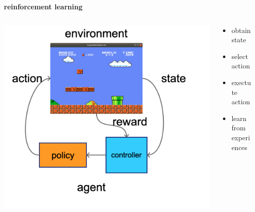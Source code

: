 \documentclass[xcolor=dvipsnames]{beamer}
\begin{document}
\begin{frame}{\bf reinforcement learning}

  \begin{columns}

    \begin{column}{0.5\textwidth}
      {\centering \includegraphics[scale=0.15]{../diagrams/basic/reinforcementlearning.png}}
    \end{column}

    \begin{column}{0.5\textwidth}
      \begin{itemize}
        \item obtain state
        \item select action
        \item exectute action
        \item learn from experiences
      \end{itemize}
    \end{column}

  \end{columns}

\end{frame}
\end{document}
